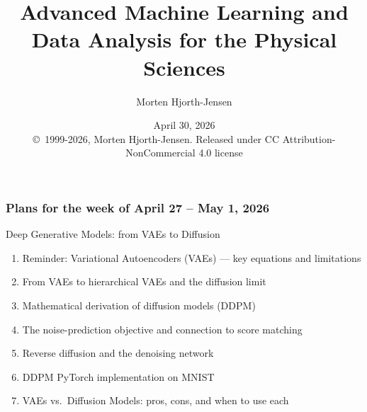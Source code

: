 \documentclass{beamer}
\begin{document}
\newcommand{\exercisesection}[1]{\subsection*{#1}}

\title{Advanced Machine Learning and Data Analysis for the Physical Sciences}
\author{Morten Hjorth-Jensen}
\date{April 30, 2026\\
{\tiny \copyright\ 1999-2026, Morten Hjorth-Jensen. Released under CC
Attribution-NonCommercial 4.0 license}}

\begin{frame}
\titlepage
\end{frame}

\begin{frame}
\frametitle{Plans for the week of April 27 -- May 1, 2026}
\begin{block}{Deep Generative Models: from VAEs to Diffusion}
\begin{enumerate}
  \item Reminder: Variational Autoencoders (VAEs) — key equations and limitations
  \item From VAEs to hierarchical VAEs and the diffusion limit
  \item Mathematical derivation of diffusion models (DDPM)
  \item The noise-prediction objective and connection to score matching
  \item Reverse diffusion and the denoising network
  \item DDPM PyTorch implementation on MNIST
  \item VAEs vs.\ Diffusion Models: pros, cons, and when to use each
\end{enumerate}
\end{block}
\end{frame}
\end{document}

